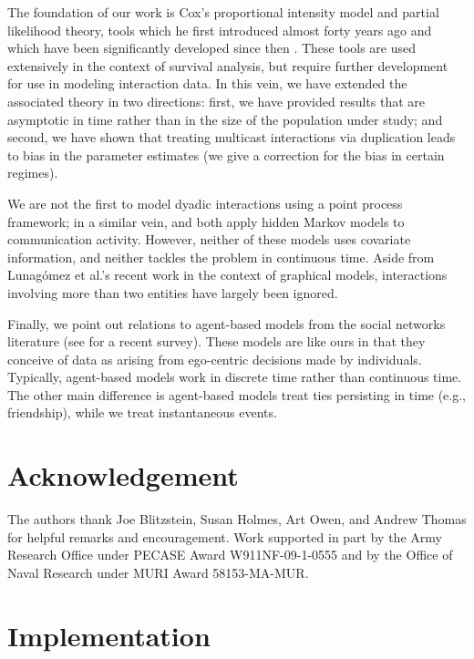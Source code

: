 \documentclass[final]{statsoc}
\begin{document}
The foundation of our work is Cox's \citeyearpar{cox1972regression} proportional intensity model and
partial likelihood theory, tools which he first introduced almost
forty years ago and which have been significantly developed since
then \citep{andersen1993statistical, cook2007statistical, cox1975partial, fleming1991counting, martinussen2006dynamic}.
These tools are used extensively in the context of survival analysis, but
require further development for use in modeling interaction data.
In this vein, we have extended the associated theory in
two directions: first, we have provided results that are asymptotic in time
rather than in the size of the population under study; and second, we
have shown that treating multicast interactions via duplication leads to
bias in the parameter estimates (we give a correction for the bias in
certain regimes).

We are not the first to model dyadic interactions using a point process
framework; in a similar vein, \citet{malmgen2009characterizing} and \citet{heard2010bayesian} both
apply hidden Markov models to communication
activity.  However,
neither of these models uses covariate information, and neither tackles
the problem in continuous time. Aside from
Lunag\'omez et al.'s \citeyearpar{lunagomez2009geometric} recent work in the
context of graphical models, interactions involving more than two
entities have largely been ignored.

Finally, we point out relations to agent-based models from the
social networks literature (see \citet{snijders2010introduction} for a recent
survey).  These models are like ours in that they conceive of data as
arising from ego-centric decisions made by individuals.  Typically,
agent-based models work in discrete time rather than continuous time.
The other main difference is agent-based models treat ties
persisting in time (e.g., friendship), while we treat
instantaneous events.


\section*{Acknowledgement}

The authors thank Joe Blitzstein, Susan Holmes, Art Owen, and Andrew Thomas
for helpful remarks and encouragement.
Work supported in part by the Army Research Office under
PECASE Award W911NF-09-1-0555 and by the Office of Naval
Research under MURI Award 58153-MA-MUR.


\appendix

\section{Implementation}\label{S:implementation}
\end{document}
